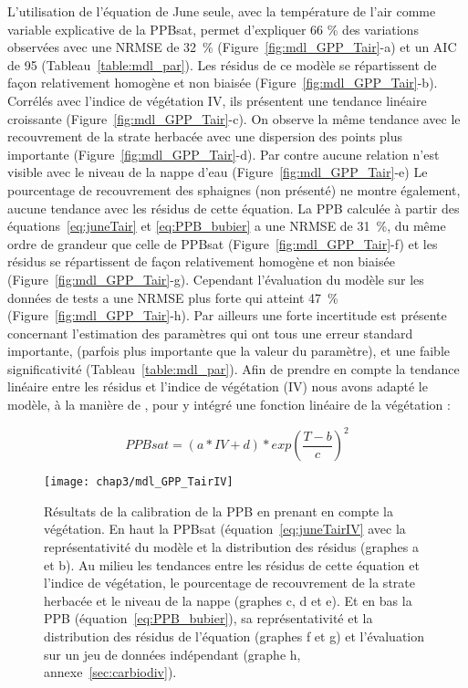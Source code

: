 L'utilisation de l'équation de June seule, avec la température de l'air comme variable explicative de la PPBsat, permet d'expliquer 66 \% des variations observées avec une NRMSE de \SI{32}{\percent} (Figure~\ref{fig:mdl_GPP_Tair}-a) et un AIC de 95 (Tableau~\ref{table:mdl_par}).
Les résidus de ce modèle se répartissent de façon relativement homogène et non biaisée (Figure~\ref{fig:mdl_GPP_Tair}-b).
Corrélés avec l'indice de végétation IV, ils présentent une tendance linéaire croissante (Figure~\ref{fig:mdl_GPP_Tair}-c).
On observe la même tendance avec le recouvrement de la strate herbacée avec une dispersion des points plus importante (Figure~\ref{fig:mdl_GPP_Tair}-d).
Par contre aucune relation n'est visible avec le niveau de la nappe d'eau (Figure~\ref{fig:mdl_GPP_Tair}-e)
Le pourcentage de recouvrement des sphaignes (non présenté) ne montre également, aucune tendance avec les résidus de cette équation.
La PPB calculée à partir des équations~\ref{eq:juneTair} et \ref{eq:PPB_bubier} a une NRMSE de \SI{31}{\percent}, du même ordre de grandeur que celle de PPBsat (Figure~\ref{fig:mdl_GPP_Tair}-f) et les résidus se répartissent de façon relativement homogène et non biaisée (Figure~\ref{fig:mdl_GPP_Tair}-g).
Cependant l'évaluation du modèle sur les données de tests a une NRMSE plus forte qui atteint \SI{47}{\percent}(Figure~\ref{fig:mdl_GPP_Tair}-h).
Par ailleurs une forte incertitude est présente concernant l'estimation des paramètres qui ont tous une erreur standard importante, (parfois plus importante que la valeur du paramètre), et une faible significativité (Tableau~\ref{table:mdl_par}).
Afin de prendre en compte la tendance linéaire entre les résidus et l'indice de végétation (IV) nous avons adapté le modèle, à la manière de \citet{bortoluzzi2006a}, pour y intégré une fonction linéaire de la végétation :

\begin{equation}\label{eq:juneTairIV}
PPBsat = (a * IV + d) * exp\left(\frac{T - b}{c}\right)^2
\end{equation}

\begin{figure} %
\centering
\texttt{[image: chap3/mdl\_GPP\_TairIV]}
\caption{Résultats de la calibration de la PPB en prenant en compte la végétation. En haut la PPBsat (équation~\ref{eq:juneTairIV} avec la représentativité du modèle et la distribution des résidus (graphes a et b). Au milieu les tendances entre les résidus de cette équation et l'indice de végétation, le pourcentage de recouvrement de la strate herbacée et le niveau de la nappe (graphes c, d et e). Et en bas la PPB (équation~\ref{eq:PPB_bubier}), sa représentativité et la distribution des résidus de l'équation (graphes f et g) et l'évaluation sur un jeu de données indépendant (graphe h, annexe~\ref{sec:carbiodiv}).}
\label{fig:mdl_GPP_TairIV}
\end{figure}

